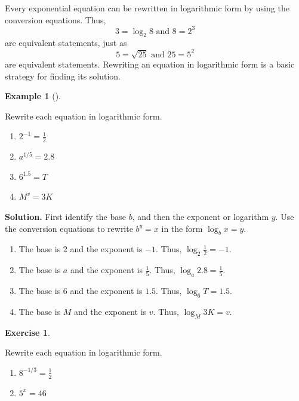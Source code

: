 \documentclass[10pt,]{book}
\theoremstyle{plain}
\theoremstyle{definition}
\theoremstyle{definition}
\newtheorem{example}[theorem]{Example}
\theoremstyle{definition}
\newtheorem{exercise}[theorem]{Exercise}
\begin{document}
	Every exponential equation can be rewritten in logarithmic form by using the conversion equations. Thus,
	\begin{equation*}3 = \log_{2}{8} \text{ and } 8 = 2^3\end{equation*}
	are equivalent statements, just as
	\begin{equation*}5 = \sqrt{25} \text{ and } 25 = 5^2\end{equation*}
	are equivalent statements. Rewriting an equation in logarithmic form is a basic  strategy for finding its solution.
%
\begin{example}[]\label{example-exponential-to-log-form}

	Rewrite each equation in logarithmic form.
	\leavevmode%
\begin{enumerate}[label=*\alph**]
\item\hypertarget{li-16}{}\(2^{−1} = \frac{1}{2}\)\item\hypertarget{li-17}{}\(a^{1/5} = 2.8\)\item\hypertarget{li-18}{}\(6^{1.5} = T\)\item\hypertarget{li-19}{}\(M^v = 3K\)\end{enumerate}

%
\par\medskip\noindent%
\textbf{Solution.}\quad 
	First identify the base \(b\), and then the exponent or logarithm \(y\). Use the conversion equations to rewrite \(b^y = x\) in the form \(\log_{b}{x} = y\).
	\leavevmode%
\begin{enumerate}[label=*\alph**]
\item\hypertarget{li-20}{}The base is \(2\) and the exponent is \(−1\). Thus, \(\log_{2}{\frac{1}{2}}= −1\).\item\hypertarget{li-21}{}The base is \(a\) and the exponent is \(\frac{1}{5}\). Thus, \(\log_{a}{2.8} = \frac{1}{5}\).\item\hypertarget{li-22}{}The base is \(6\) and the exponent is \(1.5\). Thus, \(\log_{6}{T} = 1.5\).\item\hypertarget{li-23}{}The base is \(M\) and the exponent is \(v\). Thus, \(\log_{M}{3K} = v\).\end{enumerate}

%
\end{example}
\begin{exercise}\label{exercise-exponential-to-log-form}

	Rewrite each equation in logarithmic form.
	\leavevmode%
\begin{enumerate}[label=*\alph**]
\item\hypertarget{li-24}{}\(8^{−1/3} = \frac{1}{2}\)\item\hypertarget{li-25}{}\(5^x = 46\)\end{enumerate}

%
\end{exercise}
\typeout{************************************************}
\typeout{************************************************}
\end{document}
